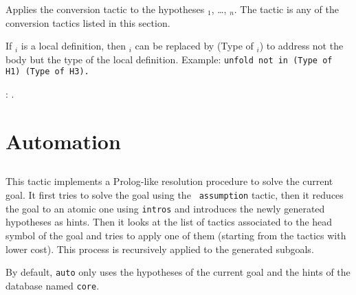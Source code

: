 Applies the conversion tactic {\convtactic} to the
hypotheses \ident$_1$, \ldots, \ident$_n$. The tactic {\convtactic} is
any of the conversion tactics listed in this section.

If \ident$_i$ is a local definition, then \ident$_i$ can be replaced
by (Type of \ident$_i$) to address not the body but the type of the
local definition. Example: {\tt unfold not in (Type of H1) (Type of H3).}

\begin{ErrMsgs}
\item {} : {\ident}.
\end{ErrMsgs}


\section{Automation}
\subsection{}
\label{auto}

This tactic implements a Prolog-like resolution procedure to solve the
current goal. It first tries to solve the goal using the {\tt
  assumption} tactic, then it reduces the goal to an atomic one using
{\tt intros} and introduces the newly generated hypotheses as hints.
Then it looks at the list of tactics associated to the head symbol of
the goal and tries to apply one of them (starting from the tactics
with lower cost). This process is recursively applied to the generated
subgoals.

By default, \texttt{auto} only uses the hypotheses of the current goal and the
hints of the database named {\tt core}.

